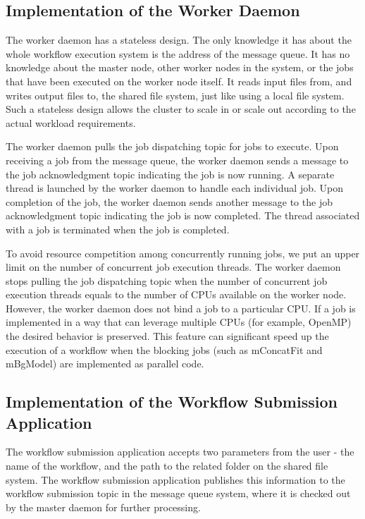 \subsection{Implementation of the Worker Daemon}
\label{sec:subsec:worker_daemon}

The worker daemon has a stateless design. The only knowledge it has about the whole workflow execution system is the address of the message queue. It has no knowledge about the master node, other worker nodes in the system, or the jobs that have been executed on the worker node itself. It reads input files from, and writes output files to, the shared file system, just like using a local file system. Such a stateless design allows the cluster to scale in or scale out according to the actual workload requirements. 

The worker daemon pulls the job dispatching topic for jobs to execute. Upon receiving a job from the message queue, the worker daemon sends a message to the job acknowledgment topic indicating the job is now running. A separate thread is launched by the worker daemon to handle each individual job. Upon completion of the job, the worker daemon sends another message to the job acknowledgment topic indicating the job is now completed. The thread associated with a job is terminated when the job is completed. 

To avoid resource competition among concurrently running jobs, we put an upper limit on the number of concurrent job execution threads. The worker daemon stops pulling the job dispatching topic when the number of concurrent job execution threads equals to the number of CPUs available on the worker node. However, the worker daemon does not bind a job to a particular CPU. If a job is implemented in a way that can leverage multiple CPUs (for example,  OpenMP) the desired behavior is preserved. This feature can significant speed up the execution of a workflow when the blocking jobs (such as mConcatFit and mBgModel) are implemented as parallel code. 

\subsection{Implementation of the Workflow Submission Application}
\label{sec:subsec:submission_application}

The workflow submission application accepts two parameters from the user - the name of the workflow, and the path to the related folder on the shared file system. The workflow submission application publishes this information to the workflow submission topic in the message queue system, where it is checked out by the master daemon for further processing. 




